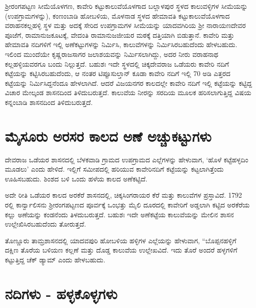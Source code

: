 ಶ‍್ರೀರಂಗಪಟ್ಟಣ ಸೀಮೆಯೊಳಗಣ, ಕಾವೇರಿ ಕಟ್ಟುಕಾಲುವೆಯೊಳಗಾದ ಬಲ್ಲಾಳಪುರ ಸ್ಥಳದ ಕಾಲುವಳ್ಳಿಗಳ ಸೀಮೆಯನ್ನು (ಉಪಗ್ರಾಮಗಳನ್ನು), ಕಂಣಂಬಾಡಿ ಹೋಬಳಿಯ, ಮೊಳನಾಡ ಸ್ಥಳದ ಹೇಮಾವತಿ ಕಟ್ಟುಕಾಲುವೆಯೊಳಗಾದ ವರಾಹನಕಲ್ಲಹಳ್ಳಿ ಸ್ಥಳ ಮತ್ತು ಅದಕ್ಕೆ ಸೇರಿದ ಉಪಗ್ರಾಮಗಳ ಸೀಮೆಯನ್ನು ಯಾದವಗಿರಿಯ ಶ‍್ರೀ ನಾರಾಯಣದೇವರ ಪೂಜೆಗೆ, ರಾಮಾನುಜಕೂಟಕ್ಕೆ, ವೇದಂತಿ ರಾಮಾನುಜಜೀಯರ ಮಠಕ್ಕೆ ದತ್ತಿಯಾಗಿ ಬಿಡುತ್ತಾನೆ. ಕಾವೇರಿ ಮತ್ತು ಹೇಮಾವತಿ ನದಿಗಳಿಗೆ ಇಲ್ಲಿ ಅಣೆಕಟ್ಟುಗಳನ್ನು ನಿರ್ಮಿಸಿ, ಕಾಲುವೆಗಳನ್ನು ನಿರ್ಮಿಸಿರಬಹುದೆಂದು ಹೇಳಬಹುದು. ಇಲಿಂದ ಮುಂದೆಯೇ ಕೃಷ್ಣರಾಜಸಾಗರ ಜಲಾಶಯವನ್ನು ನಿರ್ಮಿಸಲಾಗಿದ್ದು, ಅದರ ನೀರು ವರಾಹನಾಥ ಕಲ್ಲಹಳ್ಳಿಯವರಗೂ ಬಂದು ನಿಲ್ಲುತ್ತದೆ. ಬಹುಶಃ ಇದೇ ಸ್ಥಳದಲ್ಲಿ ಚಿಕ್ಕದೇವರಾಜ ಒಡೆಯರು ಕಾವೇರಿ ನದಿಗೆ ಕಟ್ಟೆಯನ್ನು ಕಟ್ಟಿಸಿರಬಹುದೆಂದು, ಆ ನಂತರ ಟಿಪ್ಪೂಸುಲ್ತಾನ್​ ಕೂಡಾ ಕಾವೇರಿ ನದಿಗೆ ಇಲ್ಲಿ 70 ಅಡಿ ಎತ್ತರದ ಕಟ್ಟೆಯನ್ನು ನಿರ್ಮಿಸಿದ್ದನೆಂದೂ ಹೇಳಲಾಗಿದೆ. ಆದರೆ ವಿಜಯನಗರ ಕಾಲದಲ್ಲೇ ಕಾವೇರಿ ನದಿಗೆ ಇಲ್ಲಿ ಕಟ್ಟೆಯನ್ನು ಕಟ್ಟಿದ್ದ ವಿಚಾರ ಮೇಲ್ಕಂಡ ಶಾಸನದಿಂದ ತಿಳಿದುಬರುತ್ತದೆ. ಕಾಲುವೆಯ ನೀರನ್ನು ಸರದಿಯ ಮೂಲಕ ಹರಿಸಲಾಗುತ್ತಿದ್ದ ವಿಷಯ ಕನ್ನಂಬಾಡಿ ಶಾಸನದಿಂದ ತಿಳಿದುಬರುತ್ತದೆ.


\section{ಮೈಸೂರು ಅರಸರ ಕಾಲದ ಅಣೆ ಅಚ್ಚುಕಟ್ಟುಗಳು}

ದೇವರಾಜ ಒಡೆಯರ ಶಾಸನದಲ್ಲಿ ಬೆಳಕವಾಡಿ ಗ್ರಾಮದ ಉಪಗ್ರಾಮದ ಎಲ್ಲೆಗಳನ್ನು ಹೇಳುವಾಗ, ‘ಹೊಳೆ ಕಟ್ಟೆಹಳ್ಳದಿಂ ಮೂಡಲು’ ಎಂದು ಹೇಳಿದೆ. ಇಲ್ಲಿಗೆ ಸಮೀಪದಲ್ಲಿ ಹರಿಯುವ ಕಾವೇರಿನದಿಗೆ ಕಟ್ಟೆಯನ್ನು ಕಟ್ಟಲಾಗಿತ್ತೆಂದು ಊಹಿಸಬಹುದು. ಶಿಂಶದ ಬಳಿ ಒಂದು ಹಳೆಯ ಕಾಲದ ಅಣೆಕಟ್ಟಿದೆ.

ಅದೇ ರೀತಿ ಒಡೆಯರ ಕಾಲದ ಅರಕೆರೆ ಶಾಸನದಲ್ಲಿ, ಚಿಕ್ಕಸಿಂಗರಾಯರ ಕೆರೆ ಮತ್ತು ಕಾಲುವೆಗಳ ಪ್ರಸ್ತಾವಿದೆ. 1792 ರಲ್ಲಿ ಕಾರ್ನ್ವಾಲಿಸನು ಶ‍್ರೀರಂಗಪಟ್ಟಣದ ಪೂರ್ವಕ್ಕೆ ಒಂಭತ್ತು ಮೈಲಿ ದೂರದಲ್ಲಿ ಕಾವೇರಿಗೆ ಅಡ್ಡಲಾಗಿ ಕಟ್ಟಿದ ಅರಕೆರೆಯ ಕಲ್ಲು ಅಣೆಯನ್ನು ಕಂಡನೆಂದು ತಿಳದುಬರುತ್ತದೆ. ಬಹುಶಃ ಇದೇ ಅಣೆಕಟ್ಟೆಯ ಕಾಲುವೆಯನ್ನು ಮೇಲಿನ ಶಾಸನ ಉಲ್ಲೇಖಿಸಿರಬಹುದೆಂದು ತೋರುತ್ತದೆ.

ತೊಣ್ಣೂರು ತಾಮ್ರಶಾಸನದಲ್ಲಿ ಯಾದವಪುರಿ ಹೋಬಳಿಯ ಹಳ್ಳಿಗಳ ಎಲ್ಲೆಯನ್ನು ಹೇಳುವಾಗ, “ಬೊಪ್ಪನಹಳ್ಳಿಗೆ ದಕ್ಷಿಣ ತೊರೆಯ ಬಳಿಯಣ ಕಲ್ಲಣೆ ಮತ್ತು ದೊಡ್ಡ ಕಾಲುವೆಯ ಉಲ್ಲೇಖವಿದೆ. ಇದು ತೊರೆ ಅಂದರೆ ಹಳ್ಳಗಳಿಗೆ ಕಟ್ಟುತ್ತಿದ್ದ ಚೆಕ್​ ಡ್ಯಾಮ್ ಎಂದು ಹೇಳಬಹುದು.


\section{ನದಿಗಳು - ಹಳ್ಳಕೊಳ್ಳಗಳು}

